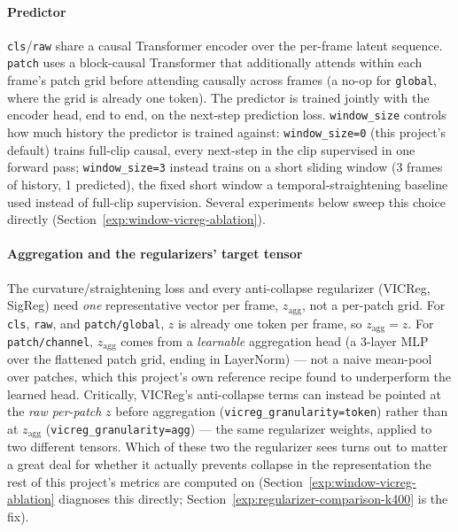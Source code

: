 \paragraph{Predictor} \texttt{cls}/\texttt{raw} share a causal Transformer encoder over
the per-frame latent sequence. \texttt{patch} uses a block-causal Transformer that
additionally attends within each frame's patch grid before attending causally across
frames (a no-op for \texttt{global}, where the grid is already one token). The predictor
is trained jointly with the encoder head, end to end, on the next-step prediction loss.
\texttt{window\_size} controls how much history the predictor is trained against:
\texttt{window\_size=0} (this project's default) trains full-clip causal, every
next-step in the clip supervised in one forward pass; \texttt{window\_size=3} instead
trains on a short sliding window (3 frames of history, 1 predicted), the fixed short
window a temporal-straightening baseline used instead of full-clip supervision. Several
experiments below sweep this choice directly (Section~\ref{exp:window-vicreg-ablation}).

\paragraph{Aggregation and the regularizers' target tensor} The curvature/straightening
loss and every anti-collapse regularizer (VICReg, SigReg) need \emph{one} representative
vector per frame, $z_{\mathrm{agg}}$, not a per-patch grid. For \texttt{cls},
\texttt{raw}, and \texttt{patch/global}, $z$ is already one token per frame, so
$z_{\mathrm{agg}}=z$. For \texttt{patch/channel}, $z_{\mathrm{agg}}$ comes from a
\emph{learnable} aggregation head (a 3-layer MLP over the flattened patch grid, ending in
LayerNorm) --- not a naive mean-pool over patches, which this project's own reference
recipe found to underperform the learned head. Critically, VICReg's anti-collapse terms
can instead be pointed at the \emph{raw per-patch} $z$ before aggregation
(\texttt{vicreg\_granularity=token}) rather than at $z_{\mathrm{agg}}$
(\texttt{vicreg\_granularity=agg}) --- the same regularizer weights, applied to two
different tensors. Which of these two the regularizer sees turns out to matter a great
deal for whether it actually prevents collapse in the representation the rest of this
project's metrics are computed on (Section~\ref{exp:window-vicreg-ablation} diagnoses
this directly; Section~\ref{exp:regularizer-comparison-k400} is the fix).

